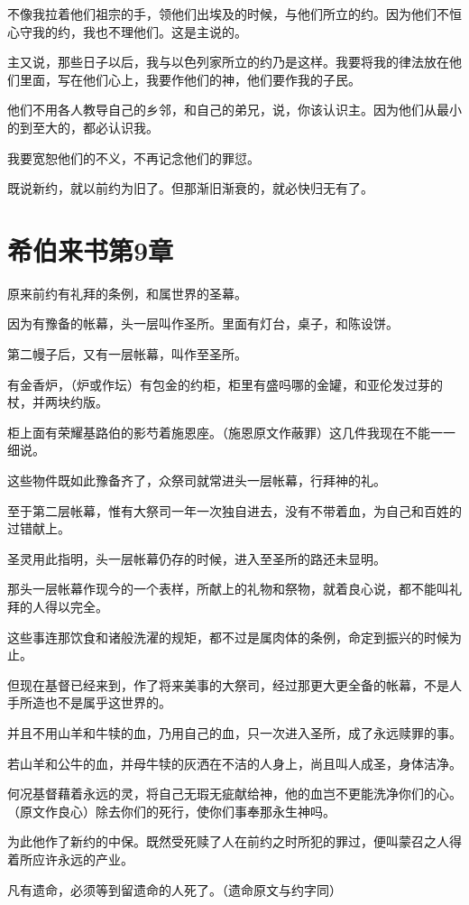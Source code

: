 \documentclass[12pt,oneside]{book}
\begin{document}
不像我拉着他们祖宗的手，领他们出埃及的时候，与他们所立的约。因为他们不恒心守我的约，我也不理他们。这是主说的。

主又说，那些日子以后，我与以色列家所立的约乃是这样。我要将我的律法放在他们里面，写在他们心上，我要作他们的神，他们要作我的子民。

他们不用各人教导自己的乡邻，和自己的弟兄，说，你该认识主。因为他们从最小的到至大的，都必认识我。

我要宽恕他们的不义，不再记念他们的罪愆。

既说新约，就以前约为旧了。但那渐旧渐衰的，就必快归无有了。

\chapter{希伯来书第9章}
原来前约有礼拜的条例，和属世界的圣幕。

因为有豫备的帐幕，头一层叫作圣所。里面有灯台，桌子，和陈设饼。

第二幔子后，又有一层帐幕，叫作至圣所。

有金香炉，（炉或作坛）有包金的约柜，柜里有盛吗哪的金罐，和亚伦发过芽的杖，并两块约版。

柜上面有荣耀基路伯的影芍着施恩座。（施恩原文作蔽罪）这几件我现在不能一一细说。

这些物件既如此豫备齐了，众祭司就常进头一层帐幕，行拜神的礼。

至于第二层帐幕，惟有大祭司一年一次独自进去，没有不带着血，为自己和百姓的过错献上。

圣灵用此指明，头一层帐幕仍存的时候，进入至圣所的路还未显明。

那头一层帐幕作现今的一个表样，所献上的礼物和祭物，就着良心说，都不能叫礼拜的人得以完全。

这些事连那饮食和诸般洗濯的规矩，都不过是属肉体的条例，命定到振兴的时候为止。

但现在基督已经来到，作了将来美事的大祭司，经过那更大更全备的帐幕，不是人手所造也不是属乎这世界的。

并且不用山羊和牛犊的血，乃用自己的血，只一次进入圣所，成了永远赎罪的事。

若山羊和公牛的血，并母牛犊的灰洒在不洁的人身上，尚且叫人成圣，身体洁净。

何况基督藉着永远的灵，将自己无瑕无疵献给神，他的血岂不更能洗净你们的心。（原文作良心）除去你们的死行，使你们事奉那永生神吗。

为此他作了新约的中保。既然受死赎了人在前约之时所犯的罪过，便叫蒙召之人得着所应许永远的产业。

凡有遗命，必须等到留遗命的人死了。（遗命原文与约字同）
\end{document}
